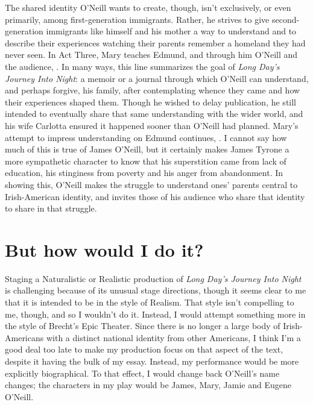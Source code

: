 \documentclass[letterpaper, 12pt]{article}
\newcommand{\ldjin}{\textit{Long Day's Journey Into Night}}
\newcommand{\oneill}{O'Neill}
\begin{document}
The shared identity \oneill{} wants to create, though, isn't exclusively, or
even primarily, among first-generation immigrants. Rather, he strives to give
second-generation immigrants like himself and his mother a way to understand
and to describe their experiences watching their parents remember a homeland
they had never seen. In Act Three, Mary teaches Edmund, and through him
\oneill{} and the audience, . In many ways, this line summarizes the goal of \ldjin{}:
a memoir or a journal through which \oneill{} can understand, and perhaps
forgive, his family, after contemplating whence they came and how their
experiences shaped them. Though he wished to delay publication, he still
intended to eventually share that same understanding with the wider world, and
his wife Carlotta ensured it happened sooner than \oneill{} had planned. Mary's
attempt to impress understanding on Edmund continues,
. I cannot say how much of this is true of James
\oneill{}, but it certainly makes James Tyrone a more sympathetic character to
know that his superstition came from lack of education, his stinginess from
poverty and his anger from abandonment. In showing this, \oneill{} makes the
struggle to understand ones' parents central to Irish-American identity, and
invites those of his audience who share that identity to share in that
struggle.

\section{But how would I do it?}

Staging a Naturalistic or Realistic production of \ldjin{} is challenging
because of its unusual stage directions, though it seems clear to me that it is
intended to be in the style of Realism. That style isn't compelling to me,
though, and so I wouldn't do it. Instead, I would attempt something more in the
style of Brecht's Epic Theater. Since there is no longer a large body of
Irish-Americans with a distinct national identity from other Americans, I think
I'm a good deal too late to make my production focus on that aspect of the
text, despite it having the bulk of my essay. Instead, my performance would be
more explicitly biographical. To that effect, I would change back \oneill{}'s
name changes; the characters in my play would be James, Mary, Jamie and Eugene
\oneill{}.
\end{document}
